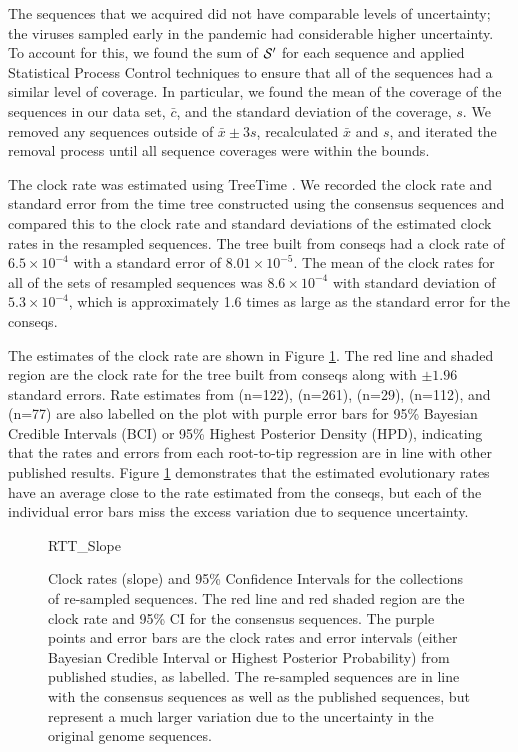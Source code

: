 \documentclass[10pt]{article}
\begin{document}
The sequences that we acquired did not have comparable levels of uncertainty; the viruses sampled early in the pandemic had considerable higher uncertainty.
To account for this, we found the sum of $\mathcal{S}'$ for each sequence and applied Statistical Process Control techniques to ensure that all of the sequences had a similar level of coverage.
In particular, we found the mean of the coverage of the sequences in our data set, $\bar c$, and the standard deviation of the coverage, $s$. 
We removed any sequences outside of $\bar x \pm 3 s$, recalculated $\bar x$ and $s$, and iterated the removal process until all sequence coverages were within the bounds.


The clock rate was estimated using TreeTime \citep{sagulenkoTreeTimeMaximumlikelihoodPhylodynamic2018}. 
We recorded the clock rate and standard error from the time tree constructed using the consensus sequences and compared this to the clock rate and standard deviations of the estimated clock rates in the resampled sequences. The tree built from conseqs had a clock rate of $6.5\times 10^{-4}$ with a standard error of $8.01\times 10^{-5}$. The mean of the clock rates for all of the sets of resampled sequences was $8.6\times 10^{-4}$ with standard deviation of $5.3\times 10^{-4}$, which is approximately 1.6 times as large as the standard error for the conseqs.


The estimates of the clock rate are shown in Figure \ref{fig:RTT_slope}. The red line and shaded region are the clock rate for the tree built from conseqs along with $\pm 1.96$ standard errors. Rate estimates from \citet{ducheneTemporalSignalPhylodynamic2020} (n=122), \citet{choudharySevereAcuteRespiratory2021} (n=261), \citet{songGenomicEpidemiologySARSCoV22021} (n=29), \citet{niePhylogeneticPhylodynamicAnalyses2020} (n=112), and \citet{geidelbergGenomicEpidemiologyDensely2021} (n=77) are also labelled on the plot with purple error bars for 95\% Bayesian Credible Intervals (BCI) or 95\% Highest Posterior Density (HPD), indicating that the rates and errors from each root-to-tip regression are in line with other published results.
Figure \ref{fig:RTT_slope} demonstrates that the estimated evolutionary rates have an average close to the rate estimated from the conseqs, but each of the individual error bars miss the excess variation due to sequence uncertainty.


\begin{figure}
RTT\_Slope
\caption{\label{fig:RTT_slope}Clock rates (slope) and 95\% Confidence Intervals for the collections of re-sampled sequences. The red line and red shaded region are the clock rate and 95\% CI for the consensus sequences. The purple points and error bars are the clock rates and error intervals (either Bayesian Credible Interval or Highest Posterior Probability) from published studies, as labelled. The re-sampled sequences are in line with the consensus sequences as well as the published sequences, but represent a much larger variation due to the uncertainty in the original genome sequences.}
\end{figure}
\end{document}
